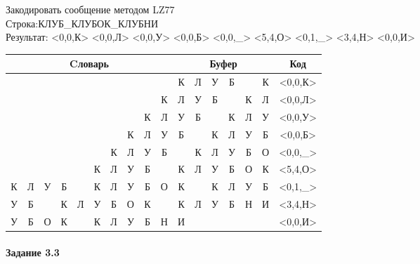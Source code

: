 \documentclass[a4paper, 12pt]{article}
\begin{document}
Закодировать сообщение методом LZ77\\
Строка:КЛУБ\_КЛУБОК\_КЛУБНИ\\
Результат: <0,0,К> <0,0,Л> <0,0,У> <0,0,Б> <0,0,\_> <5,4,О> <0,1,\_> <3,4,Н> <0,0,И>\\
\begin{table}[h!]
\centering
\begin{tabular}{|c|c|c|c|c|c|c|c|c|c|c|c|c|c|c|c|c|} 
\hline
\multicolumn{10}{|c|}{Cловарь} & \multicolumn{6}{c|}{Буфер} & Код  \\ \hline
  &   &   &   &   &   &   &   &   &   & \cellcolor[HTML]{8CE4F6} К & Л & У & Б &   & К & <0,0,К>
\\ \hline
  &   &   &   &   &   &   &   &   & К & \cellcolor[HTML]{8CE4F6} Л & У & Б &   & К & Л & <0,0,Л>
\\ \hline
  &   &   &   &   &   &   &   & К & Л & \cellcolor[HTML]{8CE4F6} У & Б &   & К & Л & У & <0,0,У>
\\ \hline
  &   &   &   &   &   &   & К & Л & У & \cellcolor[HTML]{8CE4F6} Б &   & К & Л & У & Б & <0,0,Б>
\\ \hline
  &   &   &   &   &   & К & Л & У & Б & \cellcolor[HTML]{8CE4F6}   & К & Л & У & Б & О & <0,0,\_>
\\ \hline
  &   &   &   &   & \cellcolor[HTML]{FFFF00} К & \cellcolor[HTML]{FFFF00} Л & \cellcolor[HTML]{FFFF00} У & \cellcolor[HTML]{FFFF00} Б &   & \cellcolor[HTML]{FFFF00} К & \cellcolor[HTML]{FFFF00} Л & \cellcolor[HTML]{FFFF00} У & \cellcolor[HTML]{FFFF00} Б & \cellcolor[HTML]{8CE4F6} О & К & <5,4,О>
\\ \hline
\cellcolor[HTML]{FFFF00} К & Л & У & Б &   & К & Л & У & Б & О & \cellcolor[HTML]{FFFF00} К & \cellcolor[HTML]{8CE4F6}   & К & Л & У & Б & <0,1,\_>
\\ \hline
У & Б &   & \cellcolor[HTML]{FFFF00} К & \cellcolor[HTML]{FFFF00} Л & \cellcolor[HTML]{FFFF00} У & \cellcolor[HTML]{FFFF00} Б & О & К &   & \cellcolor[HTML]{FFFF00} К & \cellcolor[HTML]{FFFF00} Л & \cellcolor[HTML]{FFFF00} У & \cellcolor[HTML]{FFFF00} Б & \cellcolor[HTML]{8CE4F6} Н & И & <3,4,Н>
\\ \hline
У & Б & О & К &   & К & Л & У & Б & Н & \cellcolor[HTML]{8CE4F6} И &   &   &   &   &   & <0,0,И>
\\ \hline
\end{tabular}
\end{table}

\paragraph{Задание 3.3}
\end{document}
